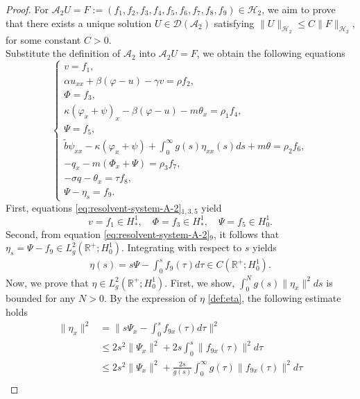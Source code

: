 \documentclass[11pt,reqno]{article}
\newcommand{\dt}{\tilde}
\begin{document}
\begin{proof}
	For $\mathcal{A}_2U = F:=(f_1,f_2,f_3,f_4,f_5,f_6,f_7,f_8,f_9) \in \mathcal{H}_2$, we aim to prove that there exists a unique solution $U\in\mathcal{D}(\mathcal{A}_2)$ satisfying $\|U\|_{\mathcal{H}_2} \leq C\|F\|_{\mathcal{H}_2}$, for some constant $C > 0$. \\
	Substitute the definition of $\mathcal{A}_2$ into $\mathcal{A}_2U = F$, we obtain the following equations
	\begin{equation}\label{eq:resolvent-system-A-2}
		\begin{cases}
			v = f_1, \\
			\alpha u_{xx} + \beta (\varphi - u) - \gamma v = \rho f_2, \\
			\Phi = f_3, \\
			\kappa (\varphi_x + \psi)_x - \beta (\varphi - u) - m \theta_x = \rho_1 f_4, \\
			\Psi = f_5, \\
			\dt b \psi_{xx} - \kappa (\varphi_x + \psi) + \int_0^\infty g(s) \eta_{xx}(s) ds + m\theta = \rho_2 f_6, \\
			-q_x - m (\Phi_x + \Psi) = \rho_3 f_7, \\
			-\sigma q - \theta_x = \tau f_8, \\
			\Psi - \eta_s = f_9.
		\end{cases}
	\end{equation}
	First, equations \eqref{eq:resolvent-system-A-2}$_{1,3,5}$ yield
	\begin{equation}\label{df1}
		v = f_1 \in H_*^1, \quad \Phi = f_3 \in H_*^1, \quad \Psi = f_5 \in H_0^1.
	\end{equation}
	Second, from equation \eqref{eq:resolvent-system-A-2}$_9$, it follows that $\eta_s = \Psi - f_9 \in L_g^2(\mathbb{R}^+; H_0^1)$. Integrating with respect to $s$ yields
	\begin{align}\label{def:eta}
		\eta(s) = s\Psi - \int_0^s f_9(\tau)d\tau\in C(\mathbb{R}^+; H_0^1).
	\end{align}
	Now, we prove that $\eta \in L_g^2(\mathbb{R}^+; H_0^1)$. First, we show, $\int_0^N g(s)\|\eta_x\|^2ds$ is bounded for any $N > 0$.
	By the expression of $\eta$ \eqref{def:eta}, the following estimate holds
	\begin{align*}
		\|\eta_x\|^2 &= \|s\Psi_x - \int_0^s f_{9x}(\tau)d\tau\|^2\\
		 &\le 2s^2\|\Psi_x\|^2 + 2s\int_0^s\| f_{9x}(\tau)\|^2d\tau  \\
		&\le 2s^2\|\Psi_x\|^2 + \frac{2s}{g(s)}\int_0^\infty g(\tau)\| f_{9x}(\tau)\|^2d\tau \\

\end{align*}
\end{proof}
\end{document}
